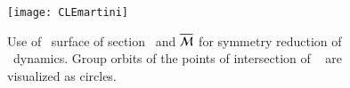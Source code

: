 {%
\begin{figure}[ht]
\begin{center}
  \texttt{[image: CLEmartini]}
\end{center}
\caption{
Use of \Poincare\ surface of section \PoincS\ and
{\slice} $\overline{\cal M}$ for symmetry reduction of \cLe\
dynamics. Group orbits of the points of intersection of \rpo\
 are visualized as circles.
    }
\label{fig:CLEmartini}
\end{figure}
}